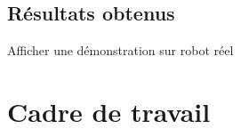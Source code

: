 \documentclass[11pt,french]{article}
\begin{document}
\subsection{Résultats obtenus}

Afficher une démonstration sur robot réel

\section{Cadre de travail}






\end{document}
